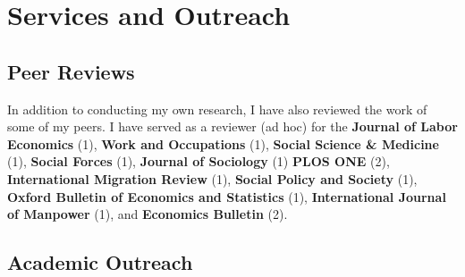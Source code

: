 \documentclass[11pt,a4paper,]{awesome-cv}
\begin{document}
\hypertarget{services-and-outreach}{%
\section{Services and Outreach}\label{services-and-outreach}}

\medskip

\hypertarget{peer-reviews}{%
\subsection{Peer Reviews}\label{peer-reviews}}

\footnotesize

In addition to conducting my own research, I have also reviewed the work
of some of my peers. I have served as a reviewer (ad hoc) for the
\textbf{Journal of Labor Economics} (1), \textbf{Work and Occupations}
(1), \textbf{Social Science \& Medicine} (1), \textbf{Social Forces}
(1), \textbf{Journal of Sociology} (1) \textbf{PLOS ONE} (2),
\textbf{International Migration Review} (1), \textbf{Social Policy and
Society} (1), \textbf{Oxford Bulletin of Economics and Statistics} (1),
\textbf{International Journal of Manpower} (1), and \textbf{Economics
Bulletin} (2). \normalsize

\medskip

\hypertarget{academic-outreach}{%
\subsection{Academic Outreach}\label{academic-outreach}}
\end{document}
